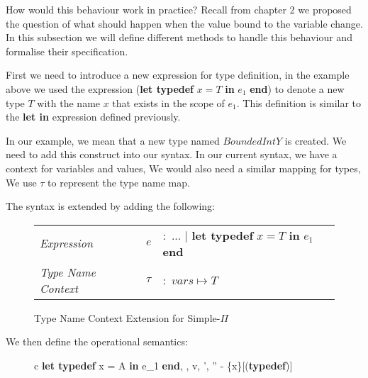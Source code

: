 \documentclass[a4paper,12pt]{report}
\begin{document}
\par
How would this behaviour work in practice? Recall from chapter 2 we proposed the 
question of what should happen when the value bound to the variable change. In 
this subsection we will define different methods to handle this behaviour and 
formalise their specification.

\par
First we need to introduce a new expression for type definition, in the example 
above we used the expression (\textbf{let typedef} $x = T$ \textbf{ in }$e_1$ \textbf {end}) 
to denote a new type $T$ with the name $x$ that exists in the scope of $e_1$. 
This definition is similar to the \textbf{let in} expression defined previously. 

In our example, we mean 
that a new type named $BoundedIntY$ is created. We need to add this construct 
into our syntax. In our current syntax, we have a context for variables and 
values, We would also need a similar mapping for types, We use $\tau$ to 
represent the type name map. 

\par
The syntax is extended by adding the following: 
\begin{figure}[H]
  \begin{center}
    \begin{tabular} {l l l}
      \textit{Expression} & $e$ & $:$ ... $|$ \textbf{let typedef }$x = T\textbf{ in } e_1$ \textbf{ end} \\
      \textit{Type Name Context} & $\tau$& $:$ $vars \mapsto T$ \\
    \end{tabular}
  \end{center}
  \caption{Type Name Context Extension for Simple-$\Pi$}
\end{figure}

\par
We then define the operational semantics: 

\begin{figure}[H]
  \begin{center}
    \begin{tabular} {c}
      {\langle \textbf{let typedef }x = A \textbf{ in }e_1\textbf{ end}, 
      \sigma, \tau \rangle \Longrightarrow 
        \langle v, \sigma', \tau'' - \{x\}\rangle}[(\textbf{typedef})] \text{ }    
    \end{tabular}
  \end{center}
\end{figure}
\end{document}
